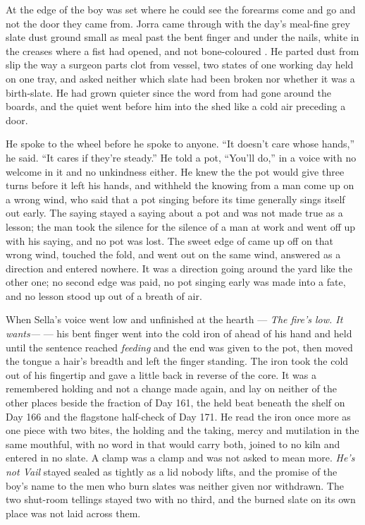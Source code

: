 \scenebreak

At the edge of  the boy was set where he could see the forearms come and go and not the door they came from. Jorra came through with the day's meal-fine grey slate dust ground small as meal past the bent finger and under the nails, white in the creases where a fist had opened, and not bone-coloured . He parted dust from slip the way a surgeon parts clot from vessel, two states of one working day held on one tray, and asked neither which slate had been broken nor whether it was a birth-slate. He had grown quieter since the word from  had gone around the boards, and the quiet went before him into the shed like a cold air preceding a door.

He spoke to the wheel before he spoke to anyone. “It doesn't care whose hands,” he said. “It cares if they're steady.” He told a pot, “You'll do,” in a voice with no welcome in it and no unkindness either. He knew the  the pot would give three turns before it left his hands, and withheld the knowing from a man come up on a wrong wind, who said that a pot singing before its time generally sings itself out early. The saying stayed a saying about a pot and was not made true as a lesson; the man took the silence for the silence of a man at work and went off up  with his saying, and no pot was lost. The sweet edge of  came up off  on that wrong wind, touched the fold, and went out on the same wind, answered as a direction and entered nowhere. It was a direction going around the yard like the other one; no second edge was paid, no pot singing early was made into a fate, and no lesson stood up out of a breath of air.

When Sella's voice went low and unfinished at the hearth --- \emph{The fire's low. It wants---} --- his bent finger went into the cold iron of  ahead of his hand and held until the sentence reached \emph{feeding} and the end was given to the pot, then moved the tongue a hair's breadth and left the finger standing. The iron took the cold out of his fingertip and gave a little back in reverse of the core. It was a remembered holding and not a change made again, and lay on neither of the other places beside the fraction of Day 161, the held beat beneath the shelf on Day 166 and the flagstone half-check of Day 171. He read the iron once more as one piece with two bites, the holding and the taking, mercy and mutilation in the same mouthful, with no word in  that would carry both, joined to no kiln and entered in no slate. A clamp was a clamp and was not asked to mean more. \emph{He's not Vail} stayed sealed as tightly as a lid nobody lifts, and the promise of the boy's name to the men who burn slates was neither given nor withdrawn. The two shut-room tellings stayed two with no third, and the burned slate on its own place was not laid across them.

